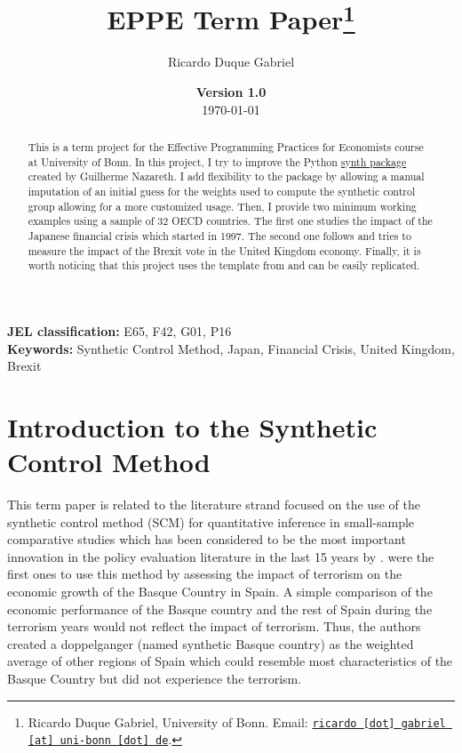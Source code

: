 \documentclass[11pt, a4paper, leqno]{article}
\begin{document}
\title{EPPE Term Paper\thanks{Ricardo Duque Gabriel, University of Bonn. Email: \href{mailto:ricardo.gabriel@uni-bonn.de}{\nolinkurl{ricardo [dot] gabriel [at] uni-bonn [dot] de}}.}}

\author{Ricardo Duque Gabriel}

\date{
{\bf Version 1.0} 
\\[1ex] 
\today
}

\maketitle


\begin{abstract}
	This is a term project for the Effective Programming Practices for Economists course at University of Bonn. In this project, I try to improve the Python \href{https://github.com/gnazareths/synth}{synth package} created by Guilherme Nazareth. I add flexibility to the package by allowing a manual imputation of an initial guess for the weights used to compute the synthetic control group allowing for a more customized usage. Then, I provide two minimum working examples using a sample of 32 OECD countries. The first one studies the impact of the Japanese financial crisis which started in 1997. The second one follows \citet{Born2018} and tries to measure the impact of the Brexit vote in the United Kingdom economy. Finally, it is worth noticing that this project uses the template from \citet{GaudeckerEconProjectTemplates} and can be easily replicated.
\end{abstract}
\vspace{5em}

\textbf{JEL classification:} E65, F42, G01, P16 \\

\textbf{Keywords:} Synthetic Control Method, Japan, Financial Crisis, United Kingdom, Brexit

\clearpage

\section{Introduction to the Synthetic Control Method}
\label{sec: Introduction}

This term paper is related to the literature strand focused on the use of the synthetic control method (SCM) for quantitative inference in small-sample comparative studies which has been considered to be  the most important innovation in the policy evaluation literature in the last 15 years by \citet{Athey2017}. \citet{Abadie2003} were the first ones to use this method by assessing the impact of terrorism on the economic growth of the Basque Country in Spain. A  simple  comparison  of  the  economic  performance  of the Basque country and the rest of Spain during the terrorism years would not reflect the impact of terrorism. Thus, the authors created a doppelganger (named synthetic Basque country) as the weighted average of other regions of Spain which could resemble most characteristics of the Basque Country but did not experience the terrorism. \\
\end{document}
